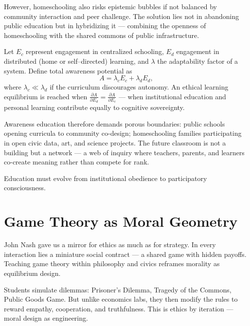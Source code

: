 \documentclass[12pt,twoside]{book}
\begin{document}
However, homeschooling also risks epistemic bubbles if not balanced by community interaction and peer challenge.  
The solution lies not in abandoning public education but in hybridizing it — combining the openness of homeschooling with the shared commons of public infrastructure.

\begin{tcolorbox}[colback=gray!5,colframe=gray!60,boxrule=0.4pt,arc=1mm,
title={Mathematical Interlude: Centralized vs. Distributed Learning Equilibria},
enhanced,breakable,left=5pt,right=5pt]
\small
Let $E_c$ represent engagement in centralized schooling, $E_d$ engagement in distributed (home or self–directed) learning, and $\lambda$ the adaptability factor of a system.  
Define total awareness potential as
\[
A = \lambda_c E_c + \lambda_d E_d,
\]
where $\lambda_c \ll \lambda_d$ if the curriculum discourages autonomy.  
An ethical learning equilibrium is reached when $\frac{\partial A}{\partial E_d} = \frac{\partial A}{\partial E_c}$ —  
when institutional education and personal learning contribute equally to cognitive sovereignty.
\end{tcolorbox}

Awareness education therefore demands porous boundaries: public schools opening curricula to community co-design; homeschooling families participating in open civic data, art, and science projects.  
The future classroom is not a building but a network — a web of inquiry where teachers, parents, and learners co-create meaning rather than compete for rank.\\

\begin{keyidea}
Education must evolve from institutional obedience to participatory consciousness.
\end{keyidea}

\section{Game Theory as Moral Geometry}

John Nash gave us a mirror for ethics as much as for strategy.  
In every interaction lies a miniature social contract — a shared game with hidden payoffs.  
Teaching game theory within philosophy and civics reframes morality as equilibrium design.

Students simulate dilemmas: Prisoner’s Dilemma, Tragedy of the Commons, Public Goods Game.  
But unlike economics labs, they then modify the rules to reward empathy, cooperation, and truthfulness.  
This is ethics by iteration — moral design as engineering.
\end{document}
